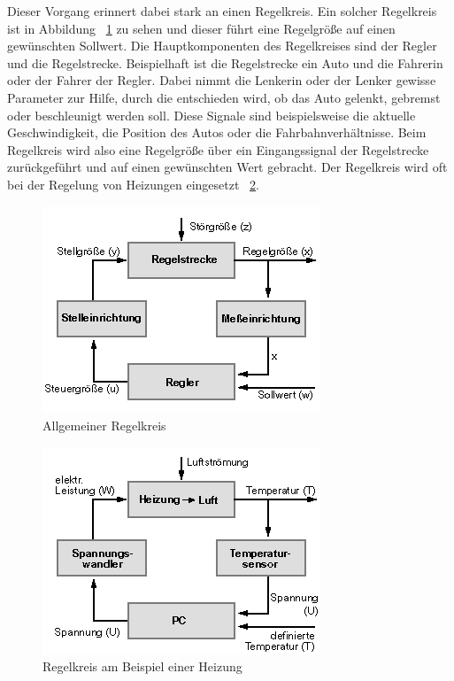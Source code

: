 Dieser Vorgang erinnert dabei stark an einen Regelkreis.
Ein solcher Regelkreis ist in Abbildung ~\ref{fig:regelkreis} zu sehen und dieser führt eine Regelgröße auf einen gewünschten Sollwert.
Die Hauptkomponenten des Regelkreises sind der Regler und die Regelstrecke.
Beispielhaft ist die Regelstrecke ein Auto und die Fahrerin oder der Fahrer der Regler.
Dabei nimmt die Lenkerin oder der Lenker gewisse Parameter zur Hilfe, durch die entschieden wird, ob das Auto gelenkt, gebremst oder beschleunigt werden soll.
Diese Signale sind beispielsweise die aktuelle Geschwindigkeit, die Position des Autos oder die Fahrbahnverhältnisse.
Beim Regelkreis wird also eine Regelgröße über ein Eingangssignal der Regelstrecke zurückgeführt und auf einen gewünschten Wert gebracht.
Der Regelkreis wird oft bei der Regelung von Heizungen eingesetzt ~\ref{fig:heizungRegelKreis}.\cite{regelkreis, regelkreisBeispiel}

\begin{figure}[hbt!]
    \centering
    \includegraphics[scale=0.8]{pics/regelkreis}
    \caption{Allgemeiner Regelkreis ~\cite{regelkreis}}
    \label{fig:regelkreis}
\end{figure}

\begin{figure}[hbt!]
    \centering
    \includegraphics[scale=0.8]{pics/regelkreis_heizung}
    \caption{Regelkreis am Beispiel einer Heizung ~\cite{regelkreis}}
    \label{fig:heizungRegelKreis}
\end{figure}

